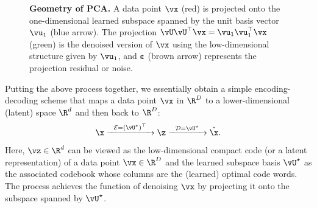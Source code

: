 \documentclass[../../book-main.tex]{subfiles}
\begin{document}
\begin{figure}
    \centering
    \caption{\small \textbf{Geometry of PCA.} A data point $\vx$ (red) is projected onto the one-dimensional learned subspace spanned by the unit basis vector $\vu_1$ (blue arrow). The projection $\vU\vU^\top\vx = \vu_{1}\vu_{1}^{\top}\vx$ (green) is the denoised version of $\vx$ using the low-dimensional structure given by $\vu_{1}$, and $\boldsymbol{\varepsilon}$ (brown arrow) represents the projection residual or noise.}
    \label{fig:pca-geometry}
\end{figure}

Putting the above process together, we essentially obtain a simple encoding-decoding scheme that maps a data point $\vx$ in $\R^D$ to a lower-dimensional (latent) space $\R^d$ and then back to $\R^D$:
\begin{equation}
\x \xrightarrow{\hspace{2mm} \mathcal{E} = (\vU^\star)^\top \hspace{2mm}}  \z
    \xrightarrow{\hspace{2mm} \mathcal{D} = \vU^\star \hspace{2mm}}   \hat{\x}.  
\label{eqn:autoencoding-PCA}
\end{equation}
Here, $\vz \in \R^d$ can be viewed as the low-dimensional compact code (or
a latent representation) of a data point  $\vx \in \R^D$ and the learned subspace
basis $\vU^\star$ as the associated codebook whose columns are the (learned)
optimal code words. The process achieves the function of denoising $\vx$ by
projecting it onto the subspace spanned by $\vU^\star$.
\end{document}
